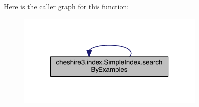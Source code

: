 Here is the caller graph for this function\-:
\nopagebreak
\begin{figure}[H]
\begin{center}
\leavevmode
\includegraphics[width=258pt]{classcheshire3_1_1index_1_1_simple_index_a72e49690bf96c6fbe0ec3475cf321baf_icgraph}
\end{center}
\end{figure}


